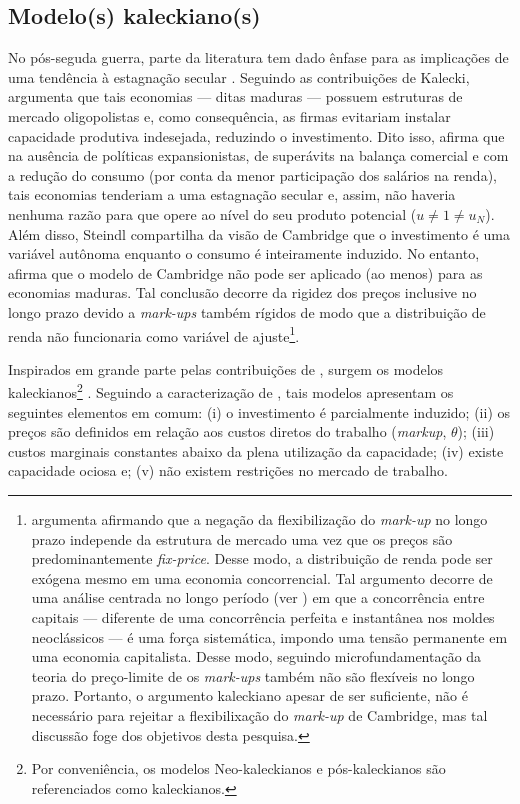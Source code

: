 \subsection{Modelo(s) kaleckiano(s)}

No pós-seguda guerra, parte da literatura tem dado ênfase para 
as implicações de uma tendência à estagnação secular \cite{setterfield_distribution_2002}.
Seguindo as contribuições de Kalecki, \textcite{steindl_maturity_1952} argumenta que tais economias --- ditas maduras --- possuem estruturas de mercado oligopolistas e, como consequência, as firmas evitariam instalar capacidade produtiva indesejada, reduzindo o investimento. 
Dito isso, \textcite{steindl_stagnation_1979} afirma que na ausência de políticas expansionistas, de superávits na balança comercial e com a redução do consumo (por conta da menor participação dos salários na renda),  tais economias tenderiam a uma estagnação secular e, assim,  não haveria nenhuma razão para que opere ao nível do seu produto potencial ($u\neq 1 \neq u_N$). 
Além disso, Steindl compartilha da visão de Cambridge que o investimento é uma variável autônoma enquanto o consumo é inteiramente induzido. 
No entanto, afirma que o modelo de Cambridge não pode ser aplicado (ao menos) para as economias maduras.  
Tal conclusão decorre da rigidez dos preços inclusive no longo prazo devido a \textit{mark-ups} também rígidos de modo que a distribuição de renda não funcionaria como variável de ajuste\footnote{
	\textcite{serrano_sraffian_1995} argumenta afirmando que a negação da flexibilização do \textit{mark-up} no longo prazo independe da estrutura de mercado uma vez que os preços são predominantemente \textit{fix-price}. Desse modo, a distribuição de renda pode ser exógena mesmo em uma economia concorrencial. Tal argumento decorre de uma análise centrada no longo período (ver \textcite{milgate_capital_1982}) em que a concorrência entre capitais --- diferente de uma concorrência perfeita e instantânea nos moldes neoclássicos ---  é uma força sistemática, impondo uma tensão permanente em uma economia capitalista. 
	Desse modo, seguindo microfundamentação da teoria do preço-limite de \textcite{labini} os \textit{mark-ups} também não são flexíveis no longo prazo.
	Portanto, o argumento kaleckiano apesar de ser suficiente,  não é necessário para  rejeitar a flexibilixação do \textit{mark-up} de Cambridge, mas tal discussão foge dos objetivos desta pesquisa.
}.

Inspirados em grande parte pelas contribuições de \textcite{steindl_stagnation_1979}, surgem os modelos kaleckianos\footnote{Por conveniência, os modelos Neo-kaleckianos e pós-kaleckianos são referenciados como kaleckianos.} \cites{rowthorn_demand_1981}{dutt_stagnation_1984}{taylor_stagnationist_1985}{amadeo_role_1986}{bhaduri_unemployment_1990}. Seguindo a caracterização de \textcite[p.~790]{lavoie_kaleckian_1995}, tais modelos apresentam os seguintes elementos em comum: (i) o investimento é parcialmente induzido; (ii) os preços são definidos em relação aos custos diretos do trabalho (\textit{markup}, $\theta$); (iii) custos marginais constantes abaixo da plena utilização da capacidade; (iv) existe capacidade ociosa e; (v) não existem restrições no mercado de trabalho. 

